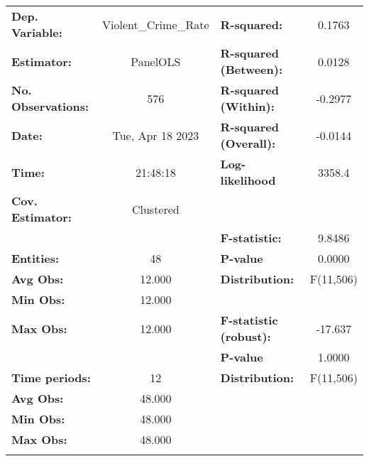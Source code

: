 \begin{center}
\begin{tabular}{lclc}
\toprule
\textbf{Dep. Variable:}           & Violent\_Crime\_Rate & \textbf{  R-squared:         }   &      0.1763      \\
\textbf{Estimator:}               &       PanelOLS       & \textbf{  R-squared (Between):}  &      0.0128      \\
\textbf{No. Observations:}        &         576          & \textbf{  R-squared (Within):}   &     -0.2977      \\
\textbf{Date:}                    &   Tue, Apr 18 2023   & \textbf{  R-squared (Overall):}  &     -0.0144      \\
\textbf{Time:}                    &       21:48:18       & \textbf{  Log-likelihood     }   &      3358.4      \\
\textbf{Cov. Estimator:}          &      Clustered       & \textbf{                     }   &                  \\
\textbf{}                         &                      & \textbf{  F-statistic:       }   &      9.8486      \\
\textbf{Entities:}                &          48          & \textbf{  P-value            }   &      0.0000      \\
\textbf{Avg Obs:}                 &        12.000        & \textbf{  Distribution:      }   &    F(11,506)     \\
\textbf{Min Obs:}                 &        12.000        & \textbf{                     }   &                  \\
\textbf{Max Obs:}                 &        12.000        & \textbf{  F-statistic (robust):} &     -17.637      \\
\textbf{}                         &                      & \textbf{  P-value            }   &      1.0000      \\
\textbf{Time periods:}            &          12          & \textbf{  Distribution:      }   &    F(11,506)     \\
\textbf{Avg Obs:}                 &        48.000        & \textbf{                     }   &                  \\
\textbf{Min Obs:}                 &        48.000        & \textbf{                     }   &                  \\
\textbf{Max Obs:}                 &        48.000        & \textbf{                     }   &                  \\
\textbf{}                         &                      & \textbf{                     }   &                  \\

\end{tabular}
\end{center}
